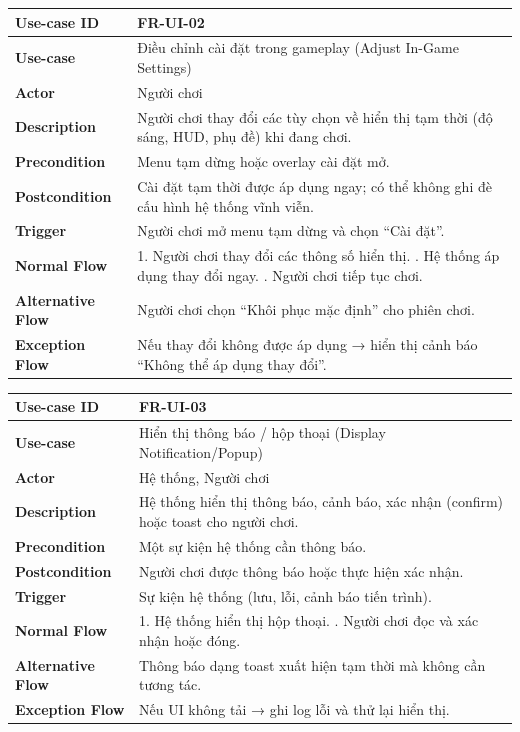 \begin{table}[H]
\centering
\begin{tabular}{|p{4cm}|p{10cm}|}
\hline
\textbf{Use-case ID} & FR-UI-02 \\ \hline
\textbf{Use-case} & Điều chỉnh cài đặt trong gameplay (Adjust In-Game Settings) \\ \hline
\textbf{Actor} & Người chơi \\ \hline
\textbf{Description} & Người chơi thay đổi các tùy chọn về hiển thị tạm thời (độ sáng, HUD, phụ đề) khi đang chơi. \\ \hline
\textbf{Precondition} & Menu tạm dừng hoặc overlay cài đặt mở. \\ \hline
\textbf{Postcondition} & Cài đặt tạm thời được áp dụng ngay; có thể không ghi đè cấu hình hệ thống vĩnh viễn. \\ \hline
\textbf{Trigger} & Người chơi mở menu tạm dừng và chọn “Cài đặt”. \\ \hline
\textbf{Normal Flow} &
1. Người chơi thay đổi các thông số hiển thị. \newline
2. Hệ thống áp dụng thay đổi ngay. \newline
3. Người chơi tiếp tục chơi. \\ \hline
\textbf{Alternative Flow} &
Người chơi chọn “Khôi phục mặc định” cho phiên chơi. \\ \hline
\textbf{Exception Flow} &
Nếu thay đổi không được áp dụng → hiển thị cảnh báo “Không thể áp dụng thay đổi”. \\ \hline
\end{tabular}
\end{table}

\begin{table}[H]
\centering
\begin{tabular}{|p{4cm}|p{10cm}|}
\hline
\textbf{Use-case ID} & FR-UI-03 \\ \hline
\textbf{Use-case} & Hiển thị thông báo / hộp thoại (Display Notification/Popup) \\ \hline
\textbf{Actor} & Hệ thống, Người chơi \\ \hline
\textbf{Description} & Hệ thống hiển thị thông báo, cảnh báo, xác nhận (confirm) hoặc toast cho người chơi. \\ \hline
\textbf{Precondition} & Một sự kiện hệ thống cần thông báo. \\ \hline
\textbf{Postcondition} & Người chơi được thông báo hoặc thực hiện xác nhận. \\ \hline
\textbf{Trigger} & Sự kiện hệ thống (lưu, lỗi, cảnh báo tiến trình). \\ \hline
\textbf{Normal Flow} &
1. Hệ thống hiển thị hộp thoại. \newline
2. Người chơi đọc và xác nhận hoặc đóng. \\ \hline
\textbf{Alternative Flow} &
Thông báo dạng toast xuất hiện tạm thời mà không cần tương tác. \\ \hline
\textbf{Exception Flow} &
Nếu UI không tải → ghi log lỗi và thử lại hiển thị. \\ \hline
\end{tabular}
\end{table}

